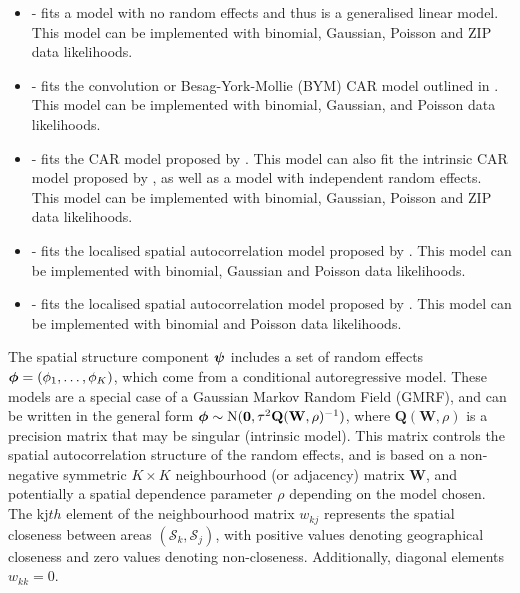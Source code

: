 \documentclass[article,shortnames,nojss]{jss}
\newcommand{\bd}[1]{\ensuremath{\mbox{\boldmath $#1$}}}
\begin{document}
\begin{itemize}
\item {} - fits a model with no random effects and thus is a generalised linear model. This model can be implemented with binomial, Gaussian, Poisson and ZIP data likelihoods.

\item {} - fits the convolution or Besag-York-Mollie (BYM) CAR model outlined in \cite{besag1991}. This model can be implemented with binomial, Gaussian, and Poisson data likelihoods.

\item {} - fits the CAR model proposed by \cite{leroux2000}. This model can also fit the intrinsic CAR model proposed by \cite{besag1991}, as well as a model with independent random effects. This model can be implemented with binomial, Gaussian, Poisson and ZIP data likelihoods.

\item {} - fits the localised spatial autocorrelation model proposed by \cite{lee2012}. This model can be implemented with binomial, Gaussian and Poisson data likelihoods.

\item {} - fits the localised spatial autocorrelation model proposed by \cite{lee2015}. This model can be implemented with binomial and Poisson data likelihoods.
\end{itemize}


The spatial structure component $\bd{\psi}$ includes a set of random effects $\bd{\phi}=(\phi_{1},\ldots,\phi_{K})$, which come from a conditional autoregressive model. These models are a special case of a Gaussian Markov Random Field (GMRF), and can be written in the general form $\bd{\phi}\sim\mbox{N}(\mathbf{0},\tau^{2}\mathbf{Q}(\mathbf{W},\rho)^{-1})$, where $\mathbf{Q}(\mathbf{W},\rho)$ is a precision matrix that may be singular (intrinsic model). This matrix controls the spatial autocorrelation structure of the random effects, and is based on a non-negative symmetric $K\times K$ neighbourhood (or adjacency) matrix $\mathbf{W}$, and potentially a spatial dependence parameter $\rho$ depending on the model chosen. The kj$th$ element of the neighbourhood matrix $w_{kj}$ represents the spatial closeness between areas $(\mathcal{S}_k, \mathcal{S}_j)$, with positive values denoting geographical closeness and zero values denoting non-closeness. Additionally, diagonal elements $w_{kk}=0$.
\end{document}
